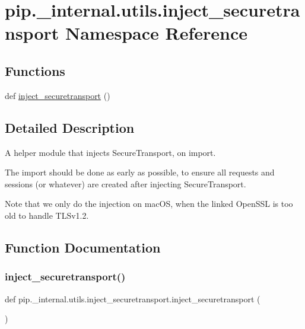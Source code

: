 \hypertarget{namespacepip_1_1__internal_1_1utils_1_1inject__securetransport}{}\section{pip.\+\_\+internal.\+utils.\+inject\+\_\+securetransport Namespace Reference}
\label{namespacepip_1_1__internal_1_1utils_1_1inject__securetransport}
\subsection*{Functions}
\begin{DoxyCompactItemize}
\item 
def \hyperlink{namespacepip_1_1__internal_1_1utils_1_1inject__securetransport_a8317a019e32e46d0506fd680db616a6b}{inject\+\_\+securetransport} ()
\end{DoxyCompactItemize}


\subsection{Detailed Description}
\begin{DoxyVerb}A helper module that injects SecureTransport, on import.

The import should be done as early as possible, to ensure all requests and
sessions (or whatever) are created after injecting SecureTransport.

Note that we only do the injection on macOS, when the linked OpenSSL is too
old to handle TLSv1.2.
\end{DoxyVerb}
 

\subsection{Function Documentation}
\mbox{\label{namespacepip_1_1__internal_1_1utils_1_1inject__securetransport_a8317a019e32e46d0506fd680db616a6b}} 
\subsubsection{\texorpdfstring{inject\+\_\+securetransport()}{inject\_securetransport()}}
{\footnotesize\ttfamily def pip.\+\_\+internal.\+utils.\+inject\+\_\+securetransport.\+inject\+\_\+securetransport (\begin{DoxyParamCaption}{ }\end{DoxyParamCaption})}

